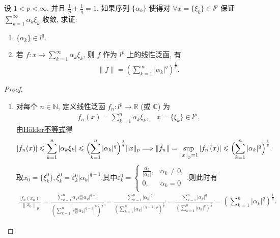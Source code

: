 \documentclass[../../main.tex]{subfiles}%
\begin{document}
\begin{example}
设 $1<p<\infty$, 并且 $\frac{1}{p}+\frac{1}{q}=1$. 如果序列 $\{\alpha_k\}$ 使得对 $\forall x=\{\xi_k\}\in l^p$ 保证 $\sum\limits_{k=1}^{\infty}\alpha_k\xi_k$ 收敛, 求证:
\begin{enumerate}[(1)]
\item $\{\alpha_k\}\in l^q$.

\item 若 $f:x\mapsto\sum\limits_{k=1}^{\infty}\alpha_k\xi_k$, 则 $f$ 作为 $l^p$ 上的线性泛函, 有
\begin{align*}
\|f\|=\left(\sum\limits_{k=1}^{\infty}|\alpha_k|^q\right)^{\frac{1}{q}}.
\end{align*}
\end{enumerate}
\end{example}
\begin{proof}
\begin{enumerate}[(1)]
\item 对每个 $n\in\mathbb{N}$, 定义线性泛函 $f_n:l^p\to\mathbb{R}$ (或 $\mathbb{C}$) 为
\begin{align*}
f_n(x)=\sum\limits_{k=1}^{n}\alpha_k\xi_k,\quad x=\{\xi_k\}\in l^p.
\end{align*}
由\hyperref[Basis of Analytics-theorem:离散的Hölder不等式]{H\"{o}lder不等式}得
\begin{align}\label{eq::jsijjjj-1}
|f_n(x)|\leqslant \sum\limits_{k=1}^{n}|\alpha_k\xi_k|\leqslant \Bigl(\sum\limits_{k=1}^{n}|\alpha_k|^q\Bigr)^{\frac{1}{q}}\|x\|_p\Longrightarrow \|f_n\| = \underset{\left\| x \right\| _p=1}{\mathrm{sup}}\left| f_n\left( x \right) \right|\leqslant \Bigl( \sum_{k=1}^n{|\alpha _k|^q} \Bigr) ^{\frac{1}{q}}. 
\end{align}
取$x_0=\{\xi_k^0\},\xi_k^0=\varepsilon_k^0|\alpha_k|^{q-1}$,其中$\varepsilon _k^0=\begin{cases}
\frac{\overline{\alpha _k}}{|\alpha _k|},&\alpha _k\ne 0,\\
0,&\alpha _k=0\\
\end{cases}$.则此时有
\begin{align*}
\frac{\left| f_n\left( x_0 \right) \right|}{\left\| x_0 \right\| _p}=\frac{\sum\limits_{k=1}^n{\alpha _k\varepsilon _k^0\left| \alpha _k \right|^{q-1}}}{\left( \sum\limits_{k=1}^n{\left| \varepsilon _k^0\left| \alpha _k \right|^{q-1} \right|^p} \right) ^{\frac{1}{p}}}=\frac{\sum\limits_{k=1}^n{\left| \alpha _k \right|^q}}{\left( \sum\limits_{k=1}^n{\left| \alpha _k \right|^{\left( q-1 \right) p}} \right) ^{\frac{1}{p}}}=\frac{\sum\limits_{k=1}^n{\left| \alpha _k \right|^q}}{\left( \sum\limits_{k=1}^n{\left| \alpha _k \right|^q} \right) ^{\frac{1}{p}}}=\left( \sum\limits_{k=1}^n{\left| \alpha _k \right|^q} \right) ^{\frac{1}{q}}.

\end{align*}
\end{enumerate}
\end{proof}
\end{document}
